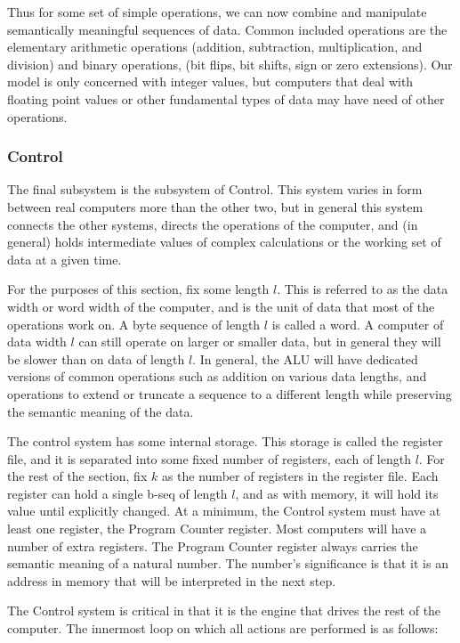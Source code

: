 \documentclass[11pt]{article}
\begin{document}
Thus for some set of simple operations, we can now combine and
manipulate semantically meaningful sequences of data. Common included
operations are the elementary arithmetic operations (addition,
subtraction, multiplication, and division) and binary operations, (bit
flips, bit shifts, sign or zero extensions). Our model is only
concerned with integer values, but computers that deal with floating
point values or other fundamental types of data may have need of other
operations.

\subsubsection{Control}
\label{sec:orga5f8baf}

The final subsystem is the subsystem of Control. This system varies in
form between real computers more than the other two, but in general
this system connects the other systems, directs the operations of the
computer, and (in general) holds intermediate values of complex
calculations or the working set of data at a given time.

For the purposes of this section, fix some length \(l\). This is
referred to as the data width or word width of the computer, and is
the unit of data that most of the operations work on. A byte sequence
of length \(l\) is called a word. A computer of data width \(l\) can still
operate on larger or smaller data, but in general they will be slower
than on data of length \(l\). In general, the ALU will have dedicated
versions of common operations such as addition on various data
lengths, and operations to extend or truncate a sequence to a
different length while preserving the semantic meaning of the data.

The control system has some internal storage. This storage is called
the register file, and it is separated into some fixed number of
registers, each of length \(l\). For the rest of the section, fix \(k\) as
the number of registers in the register file. Each register can hold a
single b-seq of length \(l\), and as with memory, it will hold its value
until explicitly changed. At a minimum, the Control system must have
at least one register, the Program Counter register. Most computers
will have a number of extra registers. The Program Counter register
always carries the semantic meaning of a natural number. The number's
significance is that it is an address in memory that will be
interpreted in the next step.

The Control system is critical in that it is the engine that drives
the rest of the computer. The innermost loop on which all actions are
performed is as follows:
\end{document}
